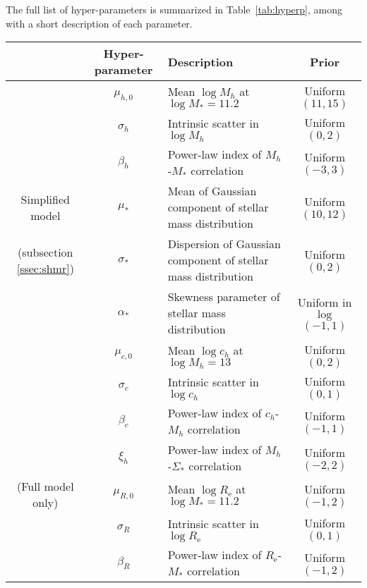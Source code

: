 \documentclass[usenatbib]{mnras}
\def\mstar{M_*}
\def\mhalo{M_{h}}
\def\chalo{c_{h}}
\def\reff{R_{\mathrm{e}}}
\def\Tref#1{Table~\ref{#1}\xspace}
\begin{document}
The full list of hyper-parameters is summarized in \Tref{tab:hyperp}, among with a short description of each parameter.
%
\begin{table*}
 \caption{Hyper-parameters of the model. The horizontal line divides the hyper-parameters between those relative to the simplified model, described in subsections \ref{ssec:shmr} and \ref{ssec:like}, and the ones appearing only in the full version of the model, introduced in subsection \ref{ssec:fullmodel}.}
 \label{tab:hyperp}
 \begin{tabular}{cclc}
 \hline
& Hyper-parameter & Description & Prior \\
 \hline
& $\mu_{h,0}$ & Mean $\log{\mhalo}$ at $\log{\mstar} = 11.2$ & Uniform$(11, 15)$\\
& $\sigma_h$ & Intrinsic scatter in $\log{\mhalo}$ & Uniform$(0, 2)$ \\
& $\beta_h$ & Power-law index of $\mhalo$-$\mstar$ correlation & Uniform$(-3, 3)$ \\
Simplified model & $\mu_*$ & Mean of Gaussian component of stellar mass distribution & Uniform$(10, 12)$\\
(subsection \ref{ssec:shmr}) & $\sigma_*$ & Dispersion of Gaussian component of stellar mass distribution & Uniform$(0, 2)$\\
& $\alpha_*$ & Skewness parameter of stellar mass distribution & Uniform in $\log$ $(-1, 1)$\\
& $\mu_{c,0}$ & Mean $\log{\chalo}$ at $\log{\mhalo} = 13$ & Uniform$(0, 2)$ \\
& $\sigma_c$ & Intrinsic scatter in $\log{\chalo}$ & Uniform$(0, 1)$ \\ 
& $\beta_c$ & Power-law index of $\chalo$-$\mhalo$ correlation & Uniform$(-1, 1)$ \\
\hline
& $\xi_h$ & Power-law index of $\mhalo$-$\Sigma_*$ correlation & Uniform$(-2, 2)$\\
(Full model only) & $\mu_{R,0}$ & Mean $\log{\reff}$ at $\log{\mstar} = 11.2$ & Uniform$(-1, 2)$ \\
& $\sigma_R$ & Intrinsic scatter in $\log{\reff}$ & Uniform$(0, 1)$ \\
& $\beta_R$ & Power-law index of $\reff$-$\mstar$ correlation & Uniform$(-1, 2)$ \\
 \hline
 \end{tabular}
\end{table*}
\end{document}
